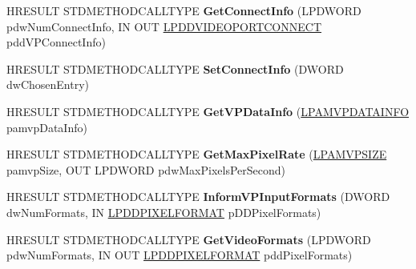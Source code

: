 \begin{DoxyCompactItemize}
\item 
\mbox{\label{class_c_v_p_v_b_i_config_a42d8c4393b4235198e042ef45fbaf384}} 
H\+R\+E\+S\+U\+LT S\+T\+D\+M\+E\+T\+H\+O\+D\+C\+A\+L\+L\+T\+Y\+PE {\bfseries Get\+Connect\+Info} (L\+P\+D\+W\+O\+RD pdw\+Num\+Connect\+Info, IN O\+UT \hyperlink{struct___d_d_v_i_d_e_o_p_o_r_t_c_o_n_n_e_c_t}{L\+P\+D\+D\+V\+I\+D\+E\+O\+P\+O\+R\+T\+C\+O\+N\+N\+E\+CT} pdd\+V\+P\+Connect\+Info)
\item 
\mbox{\label{class_c_v_p_v_b_i_config_a94a52aeabc5b321b7347909c5993817d}} 
H\+R\+E\+S\+U\+LT S\+T\+D\+M\+E\+T\+H\+O\+D\+C\+A\+L\+L\+T\+Y\+PE {\bfseries Set\+Connect\+Info} (D\+W\+O\+RD dw\+Chosen\+Entry)
\item 
\mbox{\label{class_c_v_p_v_b_i_config_a996ae39e2e0ec87e03d57b19d262abf5}} 
H\+R\+E\+S\+U\+LT S\+T\+D\+M\+E\+T\+H\+O\+D\+C\+A\+L\+L\+T\+Y\+PE {\bfseries Get\+V\+P\+Data\+Info} (\hyperlink{struct___a_m_v_p_d_a_t_a_i_n_f_o}{L\+P\+A\+M\+V\+P\+D\+A\+T\+A\+I\+N\+FO} pamvp\+Data\+Info)
\item 
\mbox{\label{class_c_v_p_v_b_i_config_a912d388ec4826620c70f1e80d32c06ce}} 
H\+R\+E\+S\+U\+LT S\+T\+D\+M\+E\+T\+H\+O\+D\+C\+A\+L\+L\+T\+Y\+PE {\bfseries Get\+Max\+Pixel\+Rate} (\hyperlink{struct___a_m_v_p_s_i_z_e}{L\+P\+A\+M\+V\+P\+S\+I\+ZE} pamvp\+Size, O\+UT L\+P\+D\+W\+O\+RD pdw\+Max\+Pixels\+Per\+Second)
\item 
\mbox{\label{class_c_v_p_v_b_i_config_a2c4c63f26611906454f5b07a6e104d94}} 
H\+R\+E\+S\+U\+LT S\+T\+D\+M\+E\+T\+H\+O\+D\+C\+A\+L\+L\+T\+Y\+PE {\bfseries Inform\+V\+P\+Input\+Formats} (D\+W\+O\+RD dw\+Num\+Formats, IN \hyperlink{interfacevoid}{L\+P\+D\+D\+P\+I\+X\+E\+L\+F\+O\+R\+M\+AT} p\+D\+D\+Pixel\+Formats)
\item 
\mbox{\label{class_c_v_p_v_b_i_config_a229c868f58054f23bbce418a30d0b259}} 
H\+R\+E\+S\+U\+LT S\+T\+D\+M\+E\+T\+H\+O\+D\+C\+A\+L\+L\+T\+Y\+PE {\bfseries Get\+Video\+Formats} (L\+P\+D\+W\+O\+RD pdw\+Num\+Formats, IN O\+UT \hyperlink{interfacevoid}{L\+P\+D\+D\+P\+I\+X\+E\+L\+F\+O\+R\+M\+AT} pdd\+Pixel\+Formats)
\item 
\mbox{\label{class_c_v_p_v_b_i_config_ac55a5dd2b4a684c466bcc464da48f438}} 

\end{DoxyCompactItemize}
